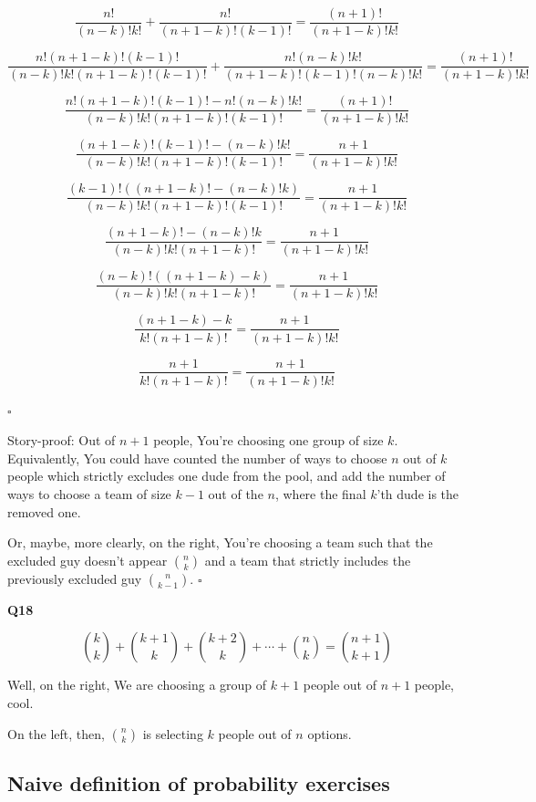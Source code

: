 \documentclass{article}
\begin{document}
			$$\frac{n!}{(n-k)!k!} + \frac{n!}{(n+1-k)!(k-1)!} = \frac{(n+1)!}{(n+1-k)!k!}$$
			
			$$\frac{n!(n+1-k)!(k-1)!}{(n-k)!k!(n+1-k)!(k-1)!} + \frac{n!(n-k)!k!}{(n+1-k)!(k-1)!(n-k)!k!} = \frac{(n+1)!}{(n+1-k)!k!}$$
			
			$$\frac{n!(n+1-k)!(k-1)! - n!(n-k)!k!}{(n-k)!k!(n+1-k)!(k-1)!} = \frac{(n+1)!}{(n+1-k)!k!}$$
			
			$$\frac{(n+1-k)!(k-1)! - (n-k)!k!}{(n-k)!k!(n+1-k)!(k-1)!} = \frac{n+1}{(n+1-k)!k!}$$
			
			$$\frac{(k-1)!((n+1-k)! - (n-k)!k)}{(n-k)!k!(n+1-k)!(k-1)!} = \frac{n+1}{(n+1-k)!k!}$$
			
			$$\frac{(n+1-k)! - (n-k)!k}{(n-k)!k!(n+1-k)!} = \frac{n+1}{(n+1-k)!k!}$$
			
			$$\frac{(n-k)!((n+1-k) - k)}{(n-k)!k!(n+1-k)!} = \frac{n+1}{(n+1-k)!k!}$$
			
			$$\frac{(n+1-k) - k}{k!(n+1-k)!} = \frac{n+1}{(n+1-k)!k!}$$
			
			$$\frac{n+1}{k!(n+1-k)!} = \frac{n+1}{(n+1-k)!k!}$$
			
			\hfill$\square$
			
			Story-proof: Out of $n+1$ people, You're choosing one group of size $k$. Equivalently, You could have counted the number of ways to choose $n$ out of $k$ people which strictly excludes one dude from the pool, and add the number of ways to choose a team of size $k-1$ out of the $n$, where the final $k$'th dude is the removed one.
			
			Or, maybe, more clearly, on the right, You're choosing a team such that the excluded guy doesn't appear ${n \choose k}$ and a team that strictly includes the previously excluded guy ${n \choose k-1}$. \hfill$\square$ 
			
			\hfill
			
		\textbf{Q18}
		
			$${k \choose k} + {k + 1 \choose k} + {k + 2 \choose k} + \cdots + {n \choose k} = {n+1 \choose k+1} $$
			
			Well, on the right, We are choosing a group of $k+1$ people out of $n+1$ people, cool. 
			
			On the left, then, ${n \choose k}$ is selecting $k$ people out of $n$ options. 
			
	\subsection{Naive definition of probability exercises}
	
\end{document}
